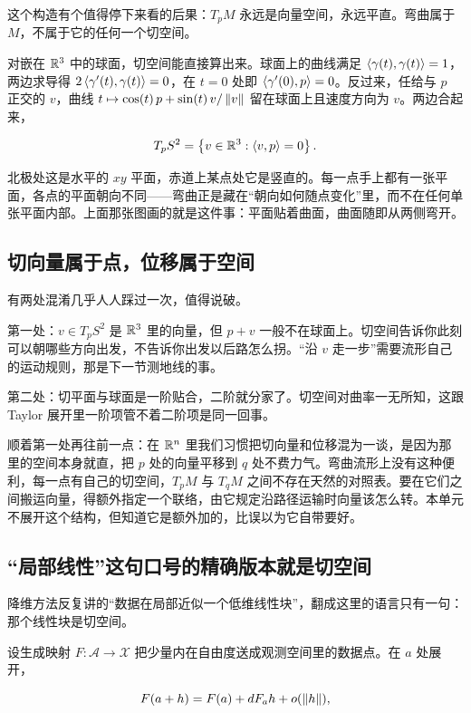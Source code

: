 这个构造有个值得停下来看的后果：\(T_{p}M\) 永远是向量空间，永远平直。弯曲属于 \(M\)，不属于它的任何一个切空间。

对嵌在 \(\mathbb{R}^{3}\) 中的球面，切空间能直接算出来。球面上的曲线满足 \(\left\langle\gamma(t),\gamma(t)\right\rangle=1\)，两边求导得 \(2\left\langle\gamma'(t),\gamma(t)\right\rangle=0\)，在 \(t=0\) 处即 \(\left\langle\gamma'(0),p\right\rangle=0\)。反过来，任给与 \(p\) 正交的 \(v\)，曲线 \(t\mapsto\cos(t)\,p+\sin(t)\,v/\left\lVert v\right\rVert\) 留在球面上且速度方向为 \(v\)。两边合起来，

\[
T_{p}S^{2}=\left\{v\in\mathbb{R}^{3}:\left\langle v,p\right\rangle=0\right\}.
\]

北极处这是水平的 \(xy\) 平面，赤道上某点处它是竖直的。每一点手上都有一张平面，各点的平面朝向不同——弯曲正是藏在``朝向如何随点变化''里，而不在任何单张平面内部。上面那张图画的就是这件事：平面贴着曲面，曲面随即从两侧弯开。

\subsection{切向量属于点，位移属于空间}

有两处混淆几乎人人踩过一次，值得说破。

第一处：\(v\in T_{p}S^{2}\) 是 \(\mathbb{R}^{3}\) 里的向量，但 \(p+v\) 一般不在球面上。切空间告诉你此刻可以朝哪些方向出发，不告诉你出发以后路怎么拐。``沿 \(v\) 走一步''需要流形自己的运动规则，那是下一节测地线的事。

第二处：切平面与球面是一阶贴合，二阶就分家了。切空间对曲率一无所知，这跟 Taylor 展开里一阶项管不着二阶项是同一回事。

顺着第一处再往前一点：在 \(\mathbb{R}^{n}\) 里我们习惯把切向量和位移混为一谈，是因为那里的空间本身就直，把 \(p\) 处的向量平移到 \(q\) 处不费力气。弯曲流形上没有这种便利，每一点有自己的切空间，\(T_{p}M\) 与 \(T_{q}M\) 之间不存在天然的对照表。要在它们之间搬运向量，得额外指定一个联络，由它规定沿路径运输时向量该怎么转。本单元不展开这个结构，但知道它是额外加的，比误以为它自带要好。

\subsection{``局部线性''这句口号的精确版本就是切空间}

降维方法反复讲的``数据在局部近似一个低维线性块''，翻成这里的语言只有一句：那个线性块是切空间。

设生成映射 \(F:\mathcal{A}\to\mathcal{X}\) 把少量内在自由度送成观测空间里的数据点。在 \(a\) 处展开，

\[
F(a+h)=F(a)+dF_{a}h+o(\left\lVert h\right\rVert),
\]

